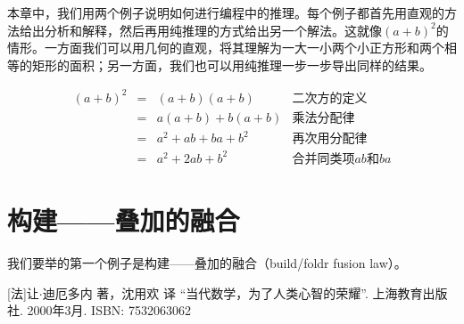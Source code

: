 \documentclass{article}
\begin{document}
本章中，我们用两个例子说明如何进行编程中的推理。每个例子都首先用直观的方法给出分析和解释，然后再用纯推理的方式给出另一个解法。这就像$(a+b)^2$的情形。一方面我们可以用几何的直观，将其理解为一大一小两个小正方形和两个相等的矩形的面积；另一方面，我们也可以用纯推理一步一步导出同样的结果。

\[
\begin{array}{rcll}
(a + b)^2 & = & (a + b)(a + b) & \text{二次方的定义} \\
          & = & a(a + b) + b(a + b) & \text{乘法分配律} \\
          & = & a^2 + ab + ba + b^2 & \text{再次用分配律} \\
          & = & a^2 + 2ab + b^2 & \text{合并同类项$ab$和$ba$}
\end{array}
\]

\section{构建——叠加的融合}

我们要举的第一个例子是构建——叠加的融合（build/foldr fusion law）。

\ifx\wholebook\relax \else
\begin{thebibliography}{99}

[法]让$\cdot$迪厄多内 著，沈用欢 译 ``当代数学，为了人类心智的荣耀''. 上海教育出版社. 2000年3月. ISBN: 7532063062

\end{thebibliography}

\expandafter\enddocument

\fi
\end{document}

